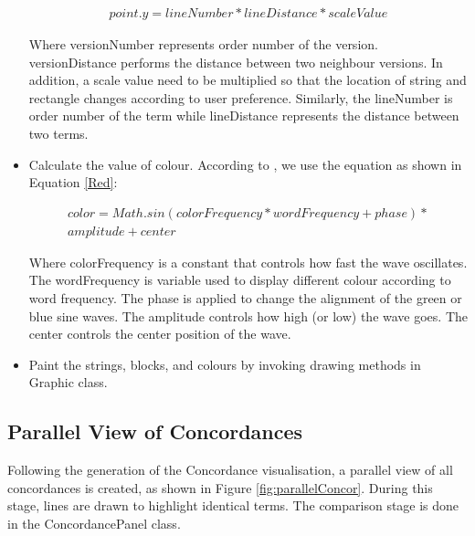 \begin{itemize}
	\begin{multline}\label{PointY}
	point.y= lineNumber*lineDistance*scaleValue
	\end{multline}
	
	Where versionNumber represents order number of the version. versionDistance performs the  distance between two neighbour versions. In addition, a scale value need to be multiplied so that the location of string and rectangle changes according to user preference.
	Similarly, the lineNumber is order number of the term while lineDistance represents the distance between two terms. 
	
	\item \textbf{}Calculate the value of colour. According to \cite{Jbum}, we use the equation as shown in Equation \eqref{Red}: 	



	\begin{multline}\label{Red}
	color = Math.sin(colorFrequency*wordFrequency + phase) *\\ amplitude + center
	\end{multline}


	Where colorFrequency is a constant that controls how fast the wave oscillates. The wordFrequency is  variable used to display different colour according to word frequency. The phase is applied to change the alignment of the green or blue sine waves. The amplitude controls how high (or low) the wave goes. The center controls the center position of the wave.
	
	\item \textbf{}Paint the strings, blocks, and colours by invoking drawing methods in Graphic class. 
	
\end{itemize}

\subsection{Parallel View of Concordances}

Following the generation of the Concordance visualisation, a parallel view of all concordances is created, as shown in Figure \ref{fig:parallelConcor}. During this stage, lines are drawn to highlight identical terms. The comparison stage is done in the ConcordancePanel class. 

